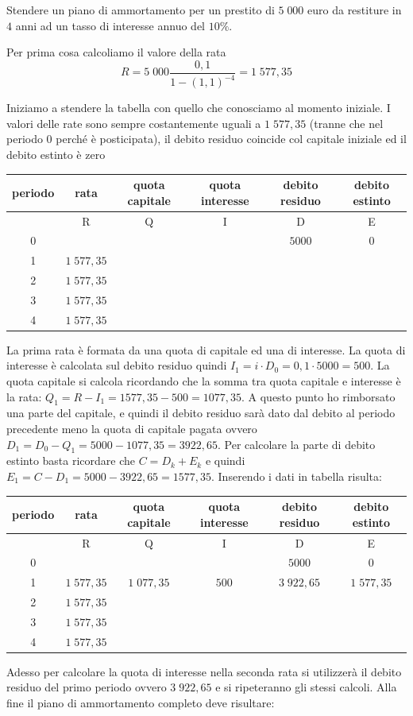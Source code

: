 \begin{exrig} \begin{esempio} Stendere un piano di ammortamento per un prestito 
di $5\;000$ euro da restiture in $4$ anni ad un tasso di interesse annuo del 
$10\%$.

Per prima cosa calcoliamo il valore della rata $$ 
R=5\;000\dfrac{0,1}{1-(1,1)^{-4}}=1\;577,35$$

Iniziamo a stendere la tabella con quello che conosciamo al momento iniziale. I 
valori delle rate sono sempre costantemente uguali a $1\;577,35$ (tranne che nel 
periodo 0 perché è posticipata), il debito residuo coincide col capitale 
iniziale ed il debito estinto è zero


\begin{tabular}{c|c|c|c|c|c} \hline periodo & rata & quota capitale & quota 
interesse & debito residuo & debito estinto\\ \hline & R & Q & I & D & E\\ 
\hline 0 &  &  &  & $5000$ & $0$\\ 1 & $1\;577,35$ &  &  &  & \\ 2 & $1\;577,35$ 
&  &  &  & \\ 3 & $1\;577,35$ &  &  &  & \\ 4 & $1\;577,35$ &  &  &  & \\ \hline 
\end{tabular} La prima rata è formata da una quota di capitale ed una di 
interesse. La quota di interesse è calcolata sul debito residuo quindi 
$I_1=i\cdot D_0=0,1\cdot 5000=500$. La quota capitale si calcola ricordando che 
la somma tra quota capitale e interesse è la rata: 
$Q_1=R-I_1=1577,35-500=1077,35$. A questo punto ho rimborsato una parte del 
capitale, e quindi il debito residuo sarà dato dal debito al periodo precedente 
meno la quota di capitale pagata ovvero $D_1=D_0-Q_1=5000-1077,35=3922,65$. Per 
calcolare la parte di debito estinto basta ricordare che $C=D_k+E_k$ e quindi 
$E_1=C-D_1=5000-3922,65=1577,35$. Inserendo i dati in tabella risulta:

\begin{tabular}{c|c|c|c|c|c} \hline periodo & rata & quota capitale & quota 
interesse & debito residuo & debito estinto\\ \hline & R & Q & I & D & E\\ 
\hline 0 &  &  &  & $5000$ & $0$\\ 1 & $1\;577,35$ & $1\;077,35$ & $500$ & 
$3\;922,65$ & $1\;577,35$\\ 2 & $1\;577,35$ &  &  &  & \\ 3 & $1\;577,35$ &  &  
&  & \\ 4 & $1\;577,35$ &  &  &  & \\ \hline \end{tabular} Adesso per calcolare 
la quota di interesse nella seconda rata si utilizzerà il debito residuo del 
primo periodo ovvero $3\;922,65$ e si ripeteranno gli stessi calcoli. Alla fine 
il piano di ammortamento completo deve risultare:



\end{esempio}
\end{exrig}
